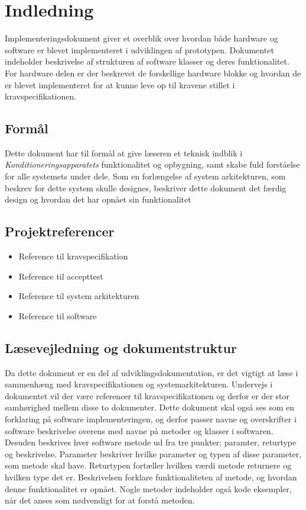 	\chapter{Indledning}
	Implementeringsdokument giver et overblik over hvordan både hardware og software er blevet implementeret i udviklingen af prototypen. Dokumentet indeholder beskrivelse af strukturen af software klasser og deres funktionalitet. For hardware delen er der beskrevet de forskellige hardware blokke og hvordan de er blevet implementeret for at kunne leve op til kravene stillet i kravspecifikationen. 
	
	\section{Formål}
	Dette dokument har til formål at give læseren et teknisk indblik i \textit{Konditioneringsapparatets} funktionalitet og opbygning, samt skabe fuld forståelse for alle systemets under dele. Som en forlængelse af system arkitekturen, som beskrev for dette system skulle designes, beskriver dette dokument det færdig design og hvordan det har opnået sin funktionalitet
	
	\section{Projektreferencer}
	\begin{itemize}
		\item Reference til kravspecifikation
		\item Reference til accepttest
		\item Reference til system arkitekturen
		\item Reference til software
	\end{itemize}
	
	\section{Læsevejledning og dokumentstruktur}
	Da dette dokument er en del af udviklingsdokumentation, er det vigtigt at læse i sammenhæng med kravspecifikationen og systemarkitekturen. Undervejs i dokumentet vil der være referencer til kravspecifikationen og derfor er der stor samhørighed mellem disse to dokumenter. Dette dokument skal også ses som en forklaring på software implementeringen, og derfor passer navne og overskrifter i software beskrivelse overens med navne på metoder og klasser i softwaren. Desuden beskrives hver software metode ud fra tre punkter; paramter, returtype og beskrivelse. Parameter beskriver hvilke parameter og typen af disse parameter, som metode skal have. Returtypen fortæller hvilken værdi metode returnere og hvilken type det er. Beskrivelsen forklare funktionaliteten af metode, og hvordan denne funktionalitet er opnået. Nogle metoder indeholder også kode eksempler, når det anses som nødvendigt for at forstå metoden. 
	

